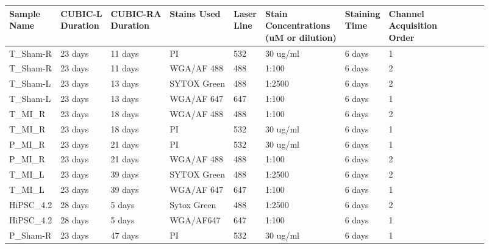 \begin{table}[H]
    \setcounter{figure}{0}
    \centering
    \begin{tabular}{|>{\small}l||>{\tiny}l|>{\tiny}l|>{\tiny}l|>{\tiny}l|>{\tiny}l|>{\tiny}l|>{\tiny}l|>{\tiny}l|>{\tiny}l|>{\tiny}l|>{\tiny}l|>{\tiny}l|}
    \hline
        \CellBreaker{Sample\\Name} & \CellBreaker{CUBIC-L \\ Duration} & \CellBreaker{CUBIC-RA\\Duration} & Stains Used & \CellBreaker{Laser\\Line} & \CellBreaker{Stain\\Concentrations\\(uM or dilution)} &  \CellBreaker{Staining\\Time} & \CellBreaker{Channel\\Acquisition\\Order} \\ \hline
        T\_Sham-R & 23 days & 11 days & PI & 532 & 30 ug/ml & 6 days & 1  \\ \hline
        T\_Sham-R & 23 days & 11 days & WGA/AF 488 & 488 & 1:100 & 6 days & 2  \\ \hline
        T\_Sham-L & 23 days & 13 days & SYTOX Green & 488 & 1:2500 & 6 days & 2  \\ \hline
        T\_Sham-L & 23 days & 13 days & WGA/AF 647 & 647 & 1:100 & 6 days & 1  \\ \hline
        T\_MI\_R & 23 days & 18 days & WGA/AF 488 & 488 & 1:100 & 6 days & 2   \\ \hline
        T\_MI\_R &  23 days & 18 days & PI & 532 & 30 ug/ml & 6 days & 1   \\ \hline
        P\_MI\_R &  23 days & 21 days & PI & 532 & 30 ug/ml & 6 days & 1   \\ \hline
        P\_MI\_R &  23 days & 21 days & WGA/AF 488 & 488 & 1:100 & 6 days & 2   \\ \hline
        T\_MI\_L &  23 days & 39 days & SYTOX Green & 488 & 1:2500 & 6 days & 2   \\ \hline
        T\_MI\_L &  23 days & 39 days & WGA/AF 647 & 647 & 1:100 & 6 days & 1   \\ \hline
        HiPSC\_4.2 & 28 days & 5 days & Sytox Green & 488 & 1:2500 & 6 days & 2   \\ \hline
        HiPSC\_4.2 &  28 days & 5 days & WGA/AF647 & 647 & 1:100 & 6 days & 1   \\ \hline
        P\_Sham-R &  23 days & 47 days & PI & 532 & 30 ug/ml & 6 days & 1   \\ \hline

\end{tabular}
\end{table}
